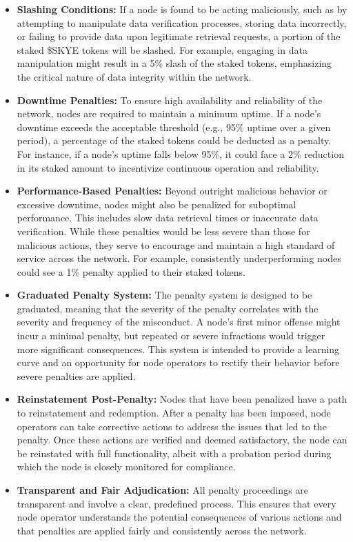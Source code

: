 \documentclass{article}
\begin{document}
\begin{itemize}
    \item \textbf{Slashing Conditions: }If a node is found to be acting maliciously, such as by attempting to manipulate data verification processes, storing data incorrectly, or failing to provide data upon legitimate retrieval requests, a portion of the staked \$SKYE tokens will be slashed. For example, engaging in data manipulation might result in a 5\% slash of the staked tokens, emphasizing the critical nature of data integrity within the network.
    \item \textbf{Downtime Penalties:} To ensure high availability and reliability of the network, nodes are required to maintain a minimum uptime. If a node's downtime exceeds the acceptable threshold (e.g., 95\% uptime over a given period), a percentage of the staked tokens could be deducted as a penalty. For instance, if a node's uptime falls below 95\%, it could face a 2\% reduction in its staked amount to incentivize continuous operation and reliability.
    \item \textbf{Performance-Based Penalties:} Beyond outright malicious behavior or excessive downtime, nodes might also be penalized for suboptimal performance. This includes slow data retrieval times or inaccurate data verification. While these penalties would be less severe than those for malicious actions, they serve to encourage and maintain a high standard of service across the network. For example, consistently underperforming nodes could see a 1\% penalty applied to their staked tokens.
    \item \textbf{Graduated Penalty System:} The penalty system is designed to be graduated, meaning that the severity of the penalty correlates with the severity and frequency of the misconduct. A node's first minor offense might incur a minimal penalty, but repeated or severe infractions would trigger more significant consequences. This system is intended to provide a learning curve and an opportunity for node operators to rectify their behavior before severe penalties are applied.
    \item \textbf{Reinstatement Post-Penalty:} Nodes that have been penalized have a path to reinstatement and redemption. After a penalty has been imposed, node operators can take corrective actions to address the issues that led to the penalty. Once these actions are verified and deemed satisfactory, the node can be reinstated with full functionality, albeit with a probation period during which the node is closely monitored for compliance.
    \item \textbf{Transparent and Fair Adjudication:} All penalty proceedings are transparent and involve a clear, predefined process. This ensures that every node operator understands the potential consequences of various actions and that penalties are applied fairly and consistently across the network.
\end{itemize}
\end{document}
